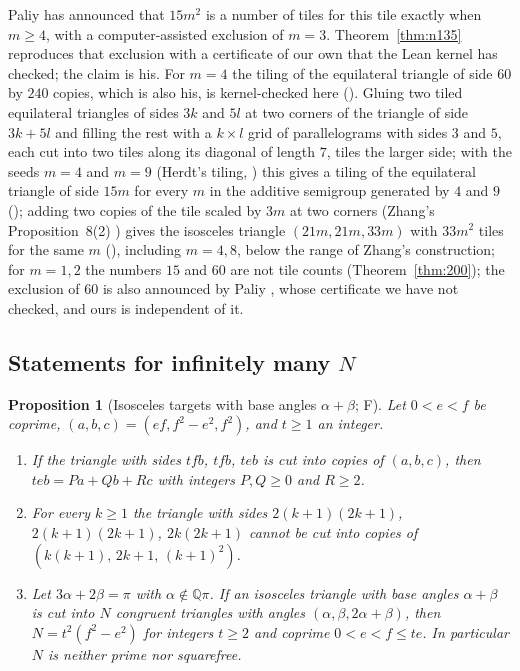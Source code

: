 \documentclass[11pt,reqno]{amsart}
\theoremstyle{plain}
\newtheorem{proposition}[theorem]{Proposition}
\theoremstyle{definition}
\newcommand{\Q}{\mathbb{Q}}
\newcommand{\sF}{\textup{\textsf{F}}}
\begin{document}
Paliy \cite{PaliyLedger} has announced that $15m^2$ is a number of tiles for this tile exactly when
$m\ge4$, with a computer-assisted exclusion of $m=3$. Theorem~\ref{thm:n135} reproduces that exclusion with a
certificate of our own that the Lean kernel has checked; the claim is his. For $m=4$ the tiling of the
equilateral triangle of side $60$ by $240$ copies, which is also his, is kernel-checked here
(). Gluing two tiled equilateral triangles of sides $3k$ and $5l$ at two corners of the triangle of side $3k+5l$ and filling the rest with a $k\times l$ grid of parallelograms with sides $3$ and $5$, each cut into two tiles along its diagonal of length $7$, tiles the larger side; with the seeds $m=4$ and $m=9$ (Herdt's tiling, \cite{Zhang}) this gives a tiling of the equilateral triangle of side $15m$ for every $m$ in the additive semigroup generated by $4$ and $9$ (); adding two copies of the tile scaled by $3m$ at two corners (Zhang's Proposition~8(2) \cite{Zhang}) gives the isosceles triangle $(21m,21m,33m)$ with $33m^2$ tiles for the same $m$ (), including $m=4,8$, below the range of Zhang's construction; for $m=1,2$ the numbers $15$ and $60$ are not tile counts
(Theorem~\ref{thm:200}); the exclusion of $60$ is also announced by Paliy \cite{PaliyLedger}, whose certificate we have not
checked, and ours is independent of it.

\subsection{Statements for infinitely many $N$}\label{sub:infinite}

\begin{proposition}[Isosceles targets with base angles $\alpha+\beta$; \sF]\label{prop:atoms}
Let $0<e<f$ be coprime, $(a,b,c)=(ef,f^2-e^2,f^2)$, and $t\ge1$ an integer.
\begin{enumerate}
\item[\textup{(i)}] If the triangle with sides $tfb$, $tfb$, $teb$ is cut into copies of $(a,b,c)$, then
$teb=Pa+Qb+Rc$ with integers $P,Q\ge0$ and $R\ge2$.
\item[\textup{(ii)}] For every $k\ge1$ the triangle with sides $2(k+1)(2k+1)$, $2(k+1)(2k+1)$, $2k(2k+1)$
cannot be cut into copies of $(k(k+1),\,2k+1,\,(k+1)^2)$.
\item[\textup{(iii)}] Let $3\alpha+2\beta=\pi$ with $\alpha\notin\Q\pi$. If an isosceles triangle with base
angles $\alpha+\beta$ is cut into $N$ congruent triangles with angles $(\alpha,\beta,2\alpha+\beta)$, then
$N=t^2(f^2-e^2)$ for integers $t\ge2$ and coprime $0<e<f\le te$. In particular $N$ is neither prime nor
squarefree.
\end{enumerate}
\end{proposition}
\end{document}
